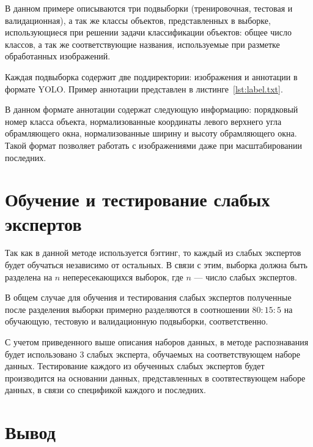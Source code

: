
В данном примере описываются три подвыборки (тренировочная, тестовая и валидационная), а так же классы объектов, представленных в выборке, использующиеся при решении задачи классификации объектов: общее число классов, а так же соответствующие названия, используемые при разметке обработанных изображений.
 
Каждая подвыборка содержит две поддиректории: изображения и аннотации в формате YOLO. Пример аннотации представлен в листинге~\ref{lst:label.txt}.


В данном формате аннотации содержат следующую информацию: порядковый номер класса объекта, нормализованные координаты левого верхнего угла обрамляющего окна, нормализованные ширину и высоту обрамляющего окна. Такой формат позволяет работать с изображениями даже при масштабировании последних.

\section{Обучение и тестирование слабых экспертов}

Так как в данной методе используется бэггинг, то каждый из слабых экспертов будет обучаться независимо от остальных. В связи с этим, выборка должна быть разделена на $n$ непересекающихся выборок, где $n$ --- число слабых экспертов.

В общем случае для обучения и тестирования слабых экспертов полученные после разделения выборки примерно разделяются в соотношении $80:15:5$ на обучающую, тестовую и валидационную подвыборки, соответственно.

С учетом приведенного выше описания наборов данных, в методе распознавания будет использовано 3 слабых эксперта, обучаемых на соответствующем наборе данных. Тестирование каждого из обученных слабых экспертов будет производится на основании данных, представленных в соотвтествующем наборе данных, в связи со спецификой каждого и последних.

\section{Вывод}